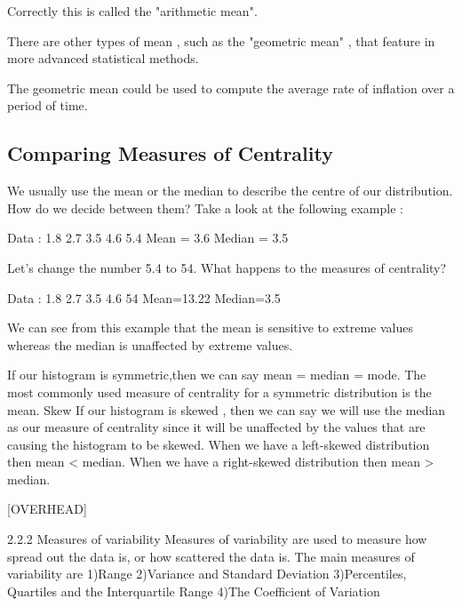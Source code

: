 \documentclass[]{report}
\begin{document}
Correctly this is called the "arithmetic mean". 
 
There are other types of mean , such as the "geometric mean" , that feature in more advanced statistical methods. 
 
The geometric mean could be used to compute the average rate of inflation over a period of time.

 



 

\subsection{Comparing Measures of Centrality}

We usually use the mean or the median to describe the centre of our distribution. How do we decide between them? Take a look at the following example :

Data  :    1.8   2.7   3.5   4.6   5.4
Mean = 3.6                Median = 3.5

Let’s change the number 5.4 to 54. What happens to the measures of centrality?

Data :  1.8    2.7   3.5   4.6   54
Mean=13.22              Median=3.5

We can see from this example that the mean is sensitive to extreme values whereas the median is unaffected by extreme values.

If our histogram is symmetric,then we can say 
mean = median = mode. 
The most commonly used measure of centrality for a symmetric distribution is the mean.
Skew
If our histogram is skewed , then we can say we will use the median as our measure of centrality since it will be unaffected by the values that are causing the histogram to be skewed.
When we have a left-skewed distribution   then 
mean < median. 
When we have a right-skewed distribution then 
mean > median.

[OVERHEAD]


 

2.2.2 Measures of variability
Measures of variability are used to measure how spread out the data is, or how scattered the data is. The main measures of variability are
1)Range
2)Variance and Standard Deviation
3)Percentiles, Quartiles and the Interquartile Range
4)The Coefficient of Variation
\end{document}

